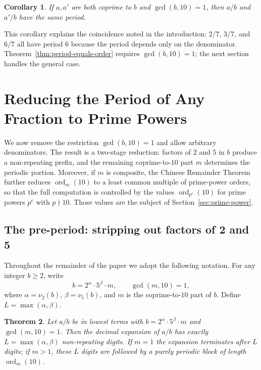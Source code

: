 \documentclass[12pt]{amsart}
\newtheorem{theorem}{Theorem}[section]
\newtheorem{corollary}[theorem]{Corollary}
\theoremstyle{definition}
\theoremstyle{remark}
\newcommand{\ord}{\operatorname{ord}}
\begin{document}
\begin{corollary}\label{cor:numerator-irrelevant}
If $a, a'$ are both coprime to $b$ and $\gcd(b, 10) = 1$, then $a/b$ 
and $a'/b$ have the same period.
\end{corollary}

This corollary explains the coincidence noted in the introduction: $2/7$, 
$3/7$, and $6/7$ all have period $6$ because the period depends only on 
the denominator. Theorem~\ref{thm:period-equals-order} requires 
$\gcd(b, 10) = 1$; the next section handles the general case.

\section{Reducing the Period of Any Fraction to Prime Powers}
\label{sec:reduction}

We now remove the restriction $\gcd(b, 10) = 1$ and allow arbitrary 
denominators. The result is a two-stage reduction: factors of $2$ and 
$5$ in $b$ produce a non-repeating prefix, and the remaining coprime-to-$10$ 
part $m$ determines the periodic portion. Moreover, if $m$ is composite, 
the Chinese Remainder Theorem further reduces $\ord_m(10)$ to a least 
common multiple of prime-power orders, so that the full computation is 
controlled by the values $\ord_{p^e}(10)$ for prime powers $p^e$ with 
$p \nmid 10$. Those values are the subject of Section~\ref{sec:prime-power}.

\subsection{The pre-period: stripping out factors of 2 and 5}

Throughout the remainder of the paper we adopt the following notation. 
For any integer $b \ge 2$, write
\[
  b = 2^\alpha \cdot 5^\beta \cdot m, \qquad \gcd(m, 10) = 1,
\]
where $\alpha = \nu_2(b)$, $\beta = \nu_5(b)$, and $m$ is the 
coprime-to-$10$ part of $b$. Define $L = \max(\alpha, \beta)$.

\begin{theorem}\label{thm:preperiod}
Let $a/b$ be in lowest terms with $b = 2^\alpha \cdot 5^\beta \cdot m$ 
and $\gcd(m, 10) = 1$. Then the decimal expansion of $a/b$ has exactly 
$L = \max(\alpha, \beta)$ non-repeating digits. If $m = 1$ the expansion 
terminates after $L$ digits; if $m > 1$, these $L$ digits are followed 
by a purely periodic block of length $\ord_m(10)$.
\end{theorem}
\end{document}
